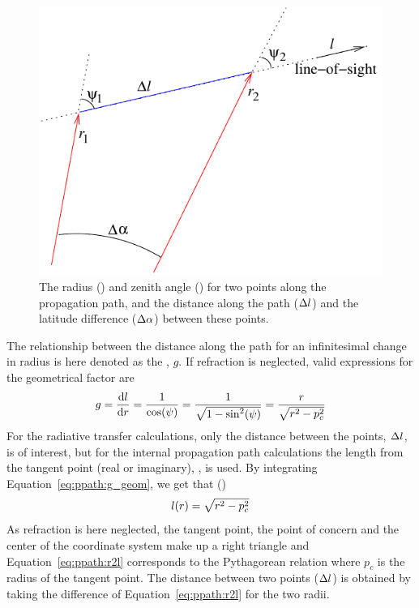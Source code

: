 \begin{figure}[!t]
 \begin{center}
  \begin{minipage}[c]{0.65\textwidth}
   \begin{center}
    \includegraphics*[width=0.9\hsize]{Figs/ppath/geom1d}
   \end{center}
  \end{minipage}%
  \begin{minipage}[c]{0.35\textwidth}
   \caption{The radius (\Rds) and zenith angle (\ZntAng) for two points along
     the propagation path, and the distance along the path ($\Delta l$)
     and the latitude difference ($\Delta\alpha$) between these points.}
   \label{fig:ppath:1d2dgeom}
  \end{minipage}
 \end{center}
\end{figure}   

The relationship between the distance along the path for an
infinitesimal change in radius is here denoted as the
, $g$. If refraction is neglected, valid
expressions for the geometrical factor are
\begin{equation}
  g = \frac{\mathrm{d} l}{\mathrm{d} r} 
           = \frac{1}{\cos(\psi)} = \frac{1}{\sqrt{1-\sin^2(\psi)}}
                                            = \frac{r}{\sqrt{r^2-p_c^2}}
  \label{eq:ppath:g_geom}
\end{equation}
For the radiative transfer calculations, only the distance between the
points, $\Delta l$, is of interest, but for the internal
propagation path calculations the length from the tangent point (real
or imaginary), \PpathLng, is used. By integrating
Equation~\ref{eq:ppath:g_geom}, we get that
()
\begin{equation}
  l(r) = \sqrt{r^2-p_c^2} 
  \label{eq:ppath:r2l}
\end{equation}
As refraction is here neglected, the tangent point, the point of
concern and the center of the coordinate system make up a right
triangle and Equation~\ref{eq:ppath:r2l} corresponds to the
Pythagorean relation where $p_c$ is the radius of the tangent point.
The distance between two points ($\Delta l$) is obtained by
taking the difference of Equation~\ref{eq:ppath:r2l} for the two
radii.

